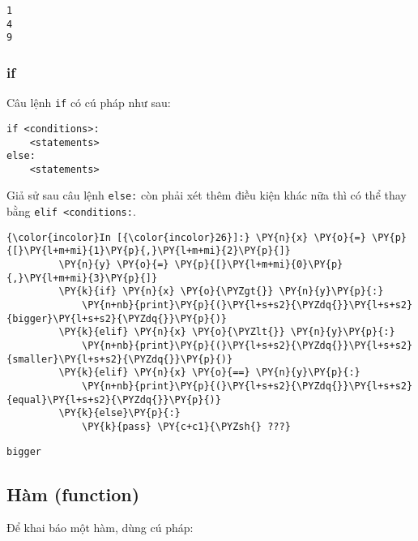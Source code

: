     \begin{Verbatim}[commandchars=\\\{\}]
1
4
9

    \end{Verbatim}

    \subsubsection{if}\label{if}

Câu lệnh \texttt{if} có cú pháp như sau:

\begin{verbatim}
if <conditions>:
    <statements>
else:
    <statements>
\end{verbatim}

Giả sử sau câu lệnh \texttt{else:} còn phải xét thêm điều kiện khác nữa
thì có thể thay bằng \texttt{elif\ \textless{}conditions:}.

    
\begin{Verbatim}[commandchars=\\\{\}]
{\color{incolor}In [{\color{incolor}26}]:} \PY{n}{x} \PY{o}{=} \PY{p}{[}\PY{l+m+mi}{1}\PY{p}{,}\PY{l+m+mi}{2}\PY{p}{]}
         \PY{n}{y} \PY{o}{=} \PY{p}{[}\PY{l+m+mi}{0}\PY{p}{,}\PY{l+m+mi}{3}\PY{p}{]}
         \PY{k}{if} \PY{n}{x} \PY{o}{\PYZgt{}} \PY{n}{y}\PY{p}{:}
             \PY{n+nb}{print}\PY{p}{(}\PY{l+s+s2}{\PYZdq{}}\PY{l+s+s2}{bigger}\PY{l+s+s2}{\PYZdq{}}\PY{p}{)}
         \PY{k}{elif} \PY{n}{x} \PY{o}{\PYZlt{}} \PY{n}{y}\PY{p}{:}
             \PY{n+nb}{print}\PY{p}{(}\PY{l+s+s2}{\PYZdq{}}\PY{l+s+s2}{smaller}\PY{l+s+s2}{\PYZdq{}}\PY{p}{)}
         \PY{k}{elif} \PY{n}{x} \PY{o}{==} \PY{n}{y}\PY{p}{:}
             \PY{n+nb}{print}\PY{p}{(}\PY{l+s+s2}{\PYZdq{}}\PY{l+s+s2}{equal}\PY{l+s+s2}{\PYZdq{}}\PY{p}{)}
         \PY{k}{else}\PY{p}{:}
             \PY{k}{pass} \PY{c+c1}{\PYZsh{} ???}
\end{Verbatim}
    

    \begin{Verbatim}[commandchars=\\\{\}]
bigger

    \end{Verbatim}

    \subsection{Hàm (function)}\label{huxe0m-function}

Để khai báo một hàm, dùng cú pháp:

